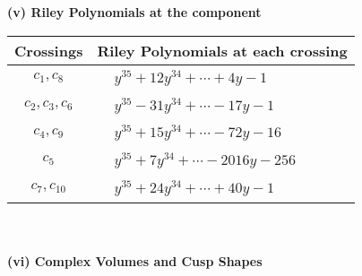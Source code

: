 \documentclass[1p]{elsarticle_modified}
\theoremstyle{definition}
\begin{document}
\newpage\renewcommand{\arraystretch}{1}
\flushleft \textbf{(v) Riley Polynomials at the component}\newline \\
\begin{tabular}{m{50pt}|m{274pt}}
Crossings & \hspace{64pt}Riley Polynomials at each crossing \\
\hline $$\begin{aligned}c_{1},c_{8}\end{aligned}$$&$\begin{aligned}
&y^{35}+12 y^{34}+\cdots+4 y-1
\end{aligned}$\\
\hline $$\begin{aligned}c_{2},c_{3},c_{6}\end{aligned}$$&$\begin{aligned}
&y^{35}-31 y^{34}+\cdots-17 y-1
\end{aligned}$\\
\hline $$\begin{aligned}c_{4},c_{9}\end{aligned}$$&$\begin{aligned}
&y^{35}+15 y^{34}+\cdots-72 y-16
\end{aligned}$\\
\hline $$\begin{aligned}c_{5}\end{aligned}$$&$\begin{aligned}
&y^{35}+7 y^{34}+\cdots-2016 y-256
\end{aligned}$\\
\hline $$\begin{aligned}c_{7},c_{10}\end{aligned}$$&$\begin{aligned}
&y^{35}+24 y^{34}+\cdots+40 y-1
\end{aligned}$\\
\hline
\end{tabular}\\~\\
\newpage\flushleft \textbf{(vi) Complex Volumes and Cusp Shapes}
\end{document}
